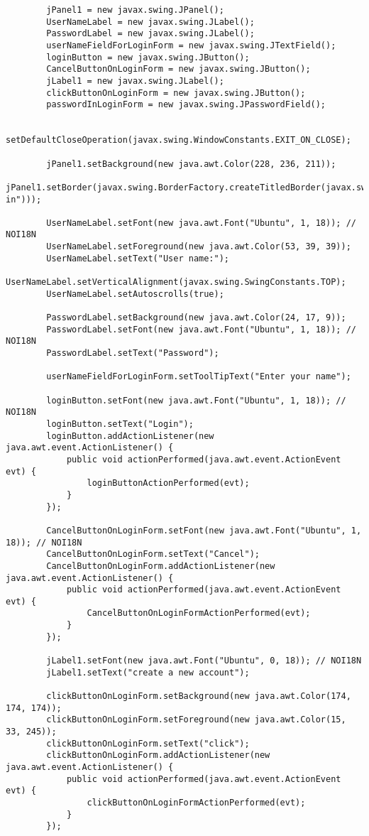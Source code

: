 \documentclass[12pt,a4paper]{article}
\begin{document}
\begin{lstlisting}
        jPanel1 = new javax.swing.JPanel();
        UserNameLabel = new javax.swing.JLabel();
        PasswordLabel = new javax.swing.JLabel();
        userNameFieldForLoginForm = new javax.swing.JTextField();
        loginButton = new javax.swing.JButton();
        CancelButtonOnLoginForm = new javax.swing.JButton();
        jLabel1 = new javax.swing.JLabel();
        clickButtonOnLoginForm = new javax.swing.JButton();
        passwordInLoginForm = new javax.swing.JPasswordField();

        setDefaultCloseOperation(javax.swing.WindowConstants.EXIT_ON_CLOSE);

        jPanel1.setBackground(new java.awt.Color(228, 236, 211));
        jPanel1.setBorder(javax.swing.BorderFactory.createTitledBorder(javax.swing.BorderFactory.createTitledBorder("Log in")));

        UserNameLabel.setFont(new java.awt.Font("Ubuntu", 1, 18)); // NOI18N
        UserNameLabel.setForeground(new java.awt.Color(53, 39, 39));
        UserNameLabel.setText("User name:");
        UserNameLabel.setVerticalAlignment(javax.swing.SwingConstants.TOP);
        UserNameLabel.setAutoscrolls(true);

        PasswordLabel.setBackground(new java.awt.Color(24, 17, 9));
        PasswordLabel.setFont(new java.awt.Font("Ubuntu", 1, 18)); // NOI18N
        PasswordLabel.setText("Password");

        userNameFieldForLoginForm.setToolTipText("Enter your name");

        loginButton.setFont(new java.awt.Font("Ubuntu", 1, 18)); // NOI18N
        loginButton.setText("Login");
        loginButton.addActionListener(new java.awt.event.ActionListener() {
            public void actionPerformed(java.awt.event.ActionEvent evt) {
                loginButtonActionPerformed(evt);
            }
        });

        CancelButtonOnLoginForm.setFont(new java.awt.Font("Ubuntu", 1, 18)); // NOI18N
        CancelButtonOnLoginForm.setText("Cancel");
        CancelButtonOnLoginForm.addActionListener(new java.awt.event.ActionListener() {
            public void actionPerformed(java.awt.event.ActionEvent evt) {
                CancelButtonOnLoginFormActionPerformed(evt);
            }
        });

        jLabel1.setFont(new java.awt.Font("Ubuntu", 0, 18)); // NOI18N
        jLabel1.setText("create a new account");

        clickButtonOnLoginForm.setBackground(new java.awt.Color(174, 174, 174));
        clickButtonOnLoginForm.setForeground(new java.awt.Color(15, 33, 245));
        clickButtonOnLoginForm.setText("click");
        clickButtonOnLoginForm.addActionListener(new java.awt.event.ActionListener() {
            public void actionPerformed(java.awt.event.ActionEvent evt) {
                clickButtonOnLoginFormActionPerformed(evt);
            }
        });


\end{lstlisting}
\end{document}
